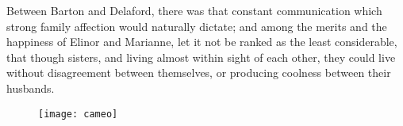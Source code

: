 Between Barton and Delaford, there was that constant communication which strong family affection would naturally dictate; and among the merits and the happiness of Elinor and Marianne, let it not be ranked as the least considerable, that though sisters, and living almost within sight of each other, they could live without disagreement between themselves, or producing coolness between their husbands.

\vfill
\begin{figure}[bh]
\centering
\texttt{[image: cameo]}
\end{figure}

